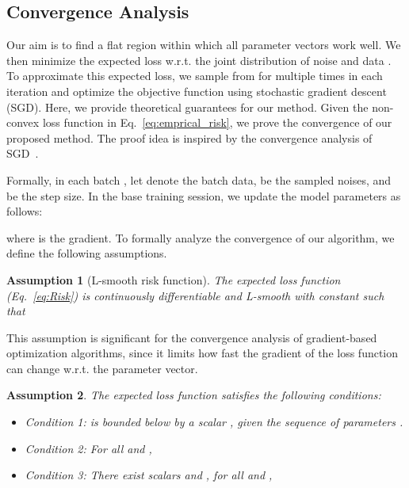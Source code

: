 \documentclass{article}
\newtheorem{assumption}{Assumption}[section]
\begin{document}
 \subsection{Convergence Analysis}\label{sec:theory}
Our aim is to find a flat region within which all parameter vectors work well. We then minimize the expected loss w.r.t. the joint distribution of noise  and data . To approximate this expected loss, we sample from  for multiple times in each iteration and optimize the objective function using stochastic gradient descent (SGD). Here, we provide theoretical guarantees for our method. Given the non-convex loss function in Eq.~\ref{eq:emprical_risk}, we prove the convergence of our proposed method. The proof idea is inspired by the convergence analysis of SGD~\citep{bottou2018optimization,Kiefer1952StochasticEO}. 

Formally, in each batch , let  denote the batch data,  be the sampled noises, and  be the step size. In the base training session, we update the model parameters as follows:


where  is the gradient. To formally analyze the convergence of our algorithm, we define the following assumptions.

\begin{assumption}[L-smooth risk function] \label{assump:risk function}
The expected loss function  {\rm(Eq.~\ref{eq:Risk})} is continuously differentiable and L-smooth with constant  such that \label{assump:L-smooth}

\end{assumption}

This assumption is significant for the convergence analysis of gradient-based optimization algorithms, since it limits how fast the gradient of the loss function can change w.r.t. the parameter vector.

\begin{assumption}\label{assump:gradient}
The expected loss function satisfies the following conditions:

\begin{itemize}
    \item Condition 1: 
     is bounded below by a scalar , given the sequence of parameters .
    \item Condition 2:
    For all  and , 
    
    \item Condition 3:
    There exist scalars  and , for all  and ,
    
\end{itemize}
\end{assumption}
\end{document}
